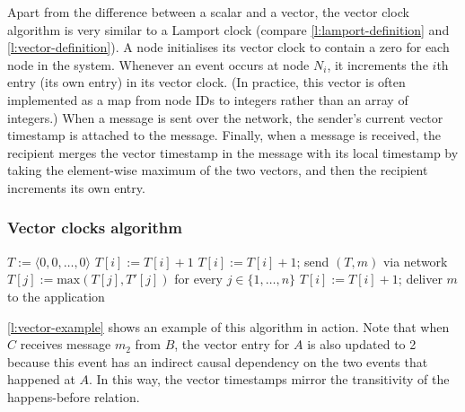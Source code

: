 Apart from the difference between a scalar and a vector, the vector clock algorithm is very similar to a Lamport clock (compare \autoref{l:lamport-definition} and \autoref{l:vector-definition}).
A node initialises its vector clock to contain a zero for each node in the system.
Whenever an event occurs at node $N_i$, it increments the $i$th entry (its own entry) in its vector clock.
(In practice, this vector is often implemented as a map from node IDs to integers rather than an array of integers.)
When a message is sent over the network, the sender's current vector timestamp is attached to the message.
Finally, when a message is received, the recipient merges the vector timestamp in the message with its local timestamp by taking the element-wise maximum of the two vectors, and then the recipient increments its own entry.

\begin{frame}
    \label{s:vector-definition}
    \frametitle{Vector clocks algorithm}
    \begin{algorithmic}
            \State $T := \langle 0, 0, \dots, 0 \rangle$ 
        \EndOn
        \State
            \State $T[i] := T[i] + 1$
        \EndOn
        \State
            \State $T[i] := T[i] + 1$; send $(T, m)$ via network
        \EndOn
        \State
            \State $T[j] := \mathrm{max}(T[j], T'[j])$ for every $j \in \{1, \dots, n\}$
            \State $T[i] := T[i] + 1$; deliver $m$ to the application
        \EndOn
    \end{algorithmic}
\end{frame}
\label{l:vector-definition}

\autoref{l:vector-example} shows an example of this algorithm in action.
Note that when $C$ receives message $m_2$ from $B$, the vector entry for $A$ is also updated to 2 because this event has an indirect causal dependency on the two events that happened at $A$.
In this way, the vector timestamps mirror the transitivity of the happens-before relation.

